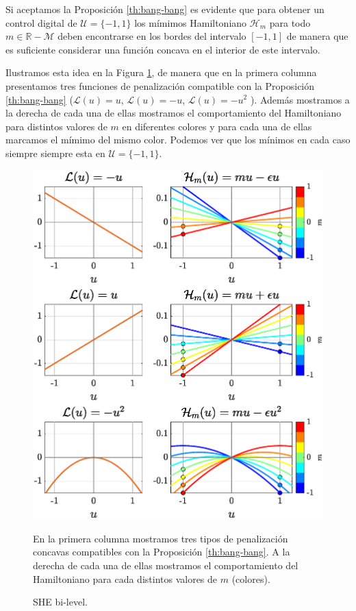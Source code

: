 Si aceptamos la Proposición \ref{th:bang-bang} es evidente que  para obtener un control digital de $\mathcal{U}=\{-1,1\}$ los mímimos Hamiltoniano $\mathcal{H}_m$ para todo $m\in \mathbb{R}-\mathcal{M}$ deben encontrarse en los bordes del intervalo $[-1,1]$ de manera que es suficiente considerar una función concava en el interior de este intervalo. 

Ilustramos esta idea en la Figura \ref{fig:Bang-Bang-penalization}, de manera que en la primera columna presentamos tres funciones de penalización compatible con la Proposición \ref{th:bang-bang} ($\mathcal{L}(u) = u$, $\mathcal{L}(u) = -u$, $\mathcal{L}(u) = -u^2$ ). Además mostramos a la derecha de cada una de ellas mostramos el comportamiento del Hamiltoniano para distintos valores de $m$ en diferentes colores y para cada una de ellas marcamos el mímimo del mismo color. Podemos ver que los mínimos en cada caso siempre siempre esta en $\mathcal{U}= \{-1,1\}$.
\begin{figure} 
    \centering
    \includegraphics[scale=0.415]{img/fig03.eps}
    \caption{SHE bi-level.} \footnotesize En la primera columna mostramos tres tipos de penalización concavas compatibles con la Proposición \ref{th:bang-bang}. A la derecha de cada una de ellas mostramos el comportamiento del Hamiltoniano para cada distintos valores de $m$ (colores). 
    \footnotesize

    \label{fig:Bang-Bang-penalization}
\end{figure}
